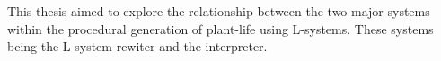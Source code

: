 
This thesis aimed to explore the relationship between the two major systems within the procedural generation of plant-life using L-systems. These systems being the L-system rewiter and the interpreter. 